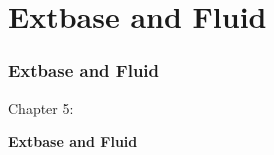 %

\section{Extbase and Fluid}
\begin{frame}[fragile]
	\frametitle{Extbase and Fluid}

	\begin{center}\huge{Chapter 5:}\end{center}
	\begin{center}\huge{\color{typo3darkgrey}\textbf{Extbase and Fluid}}\end{center}

\end{frame}

